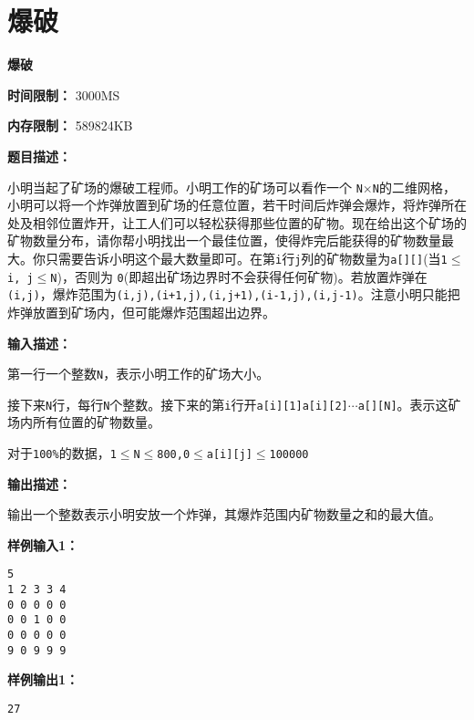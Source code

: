 \documentclass[a4paper]{ctexart}
\begin{document}
	
\section{爆破}
	
\begin{center}
	\Large \textbf{爆破}
\end{center}
	
\noindent\textbf{时间限制：} 3000MS
	
\noindent\textbf{内存限制：} 589824KB
	
\vspace{10pt}
	
\noindent\textbf{题目描述：}
	
小明当起了矿场的爆破工程师。小明工作的矿场可以看作一个 \texttt{N$\times$N}的二维网格，小明可以将一个炸弹放置到矿场的任意位置，若干时间后炸弹会爆炸，将炸弹所在处及相邻位置炸开，让工人们可以轻松获得那些位置的矿物。现在给出这个矿场的矿物数量分布，请你帮小明找出一个最佳位置，使得炸完后能获得的矿物数量最大。你只需要告诉小明这个最大数量即可。在第\texttt{i}行\texttt{j}列的矿物数量为\texttt{a[][]}(当\texttt{1$\leq$i, j$\leq$N})，否则为 \texttt{0}(即超出矿场边界时不会获得任何矿物)。若放置炸弹在\texttt{(i,j)}，爆炸范围为\texttt{(i,j),(i+1,j),(i,j+1),(i-1,j),(i,j-1)}。注意小明只能把炸弹放置到矿场内，但可能爆炸范围超出边界。
	
\noindent\textbf{输入描述：}
	
第一行一个整数\texttt{N}，表示小明工作的矿场大小。

接下来\texttt{N}行，每行\texttt{N}个整数。接下来的第\texttt{i}行开\texttt{a[i][1]a[i][2]$\cdots$a[][N]}。表示这矿场内所有位置的矿物数量。

对于\texttt{100\%}的数据，\texttt{1$\leq$N$\leq$800,0$\leq$a[i][j]$\leq$100000}
	
\noindent\textbf{输出描述：} 
	
输出一个整数表示小明安放一个炸弹，其爆炸范围内矿物数量之和的最大值。
	
\noindent\textbf{样例输入1：}
	
\lstset{numbers=none}
\begin{lstlisting}
5
1 2 3 3 4
0 0 0 0 0
0 0 1 0 0
0 0 0 0 0
9 0 9 9 9
\end{lstlisting}
\lstset{numbers=left}
	
\noindent\textbf{样例输出1：}
\lstset{numbers=none}
\begin{lstlisting}
27
\end{lstlisting}
\lstset{numbers=left}
	
	
\vspace{10pt}
	
\end{document}
